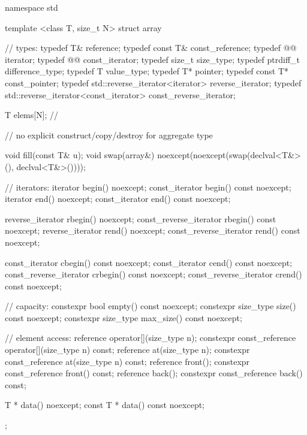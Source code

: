 \begin{codeblock}
namespace std {
  template <class T, size_t N>
  struct array {
    //  types:
    typedef T&                                    reference;
    typedef const T&                              const_reference;
    typedef @\itcorr[-1]@                iterator;
    typedef @\itcorr[-1]@                const_iterator;
    typedef size_t                                size_type;
    typedef ptrdiff_t                             difference_type;
    typedef T                                     value_type;
    typedef T*                                    pointer;
    typedef const T*                              const_pointer;
    typedef std::reverse_iterator<iterator>       reverse_iterator;
    typedef std::reverse_iterator<const_iterator> const_reverse_iterator;

    T       elems[N];           // \expos

    // no explicit construct/copy/destroy for aggregate type

    void fill(const T& u);
    void swap(array&) noexcept(noexcept(swap(declval<T&>(), declval<T&>())));

    // iterators:
    iterator               begin() noexcept;
    const_iterator         begin() const noexcept;
    iterator               end() noexcept;
    const_iterator         end() const noexcept;

    reverse_iterator       rbegin() noexcept;
    const_reverse_iterator rbegin() const noexcept;
    reverse_iterator       rend() noexcept;
    const_reverse_iterator rend() const noexcept;

    const_iterator         cbegin() const noexcept;
    const_iterator         cend() const noexcept;
    const_reverse_iterator crbegin() const noexcept;
    const_reverse_iterator crend() const noexcept;

    // capacity:
    constexpr bool      empty() const noexcept;
    constexpr size_type size() const noexcept;
    constexpr size_type max_size() const noexcept;

    // element access:
    reference                 operator[](size_type n);
    constexpr const_reference operator[](size_type n) const;
    reference                 at(size_type n);
    constexpr const_reference at(size_type n) const;
    reference                 front();
    constexpr const_reference front() const;
    reference                 back();
    constexpr const_reference back() const;

    T *       data() noexcept;
    const T * data() const noexcept;
  };
}
\end{codeblock}

